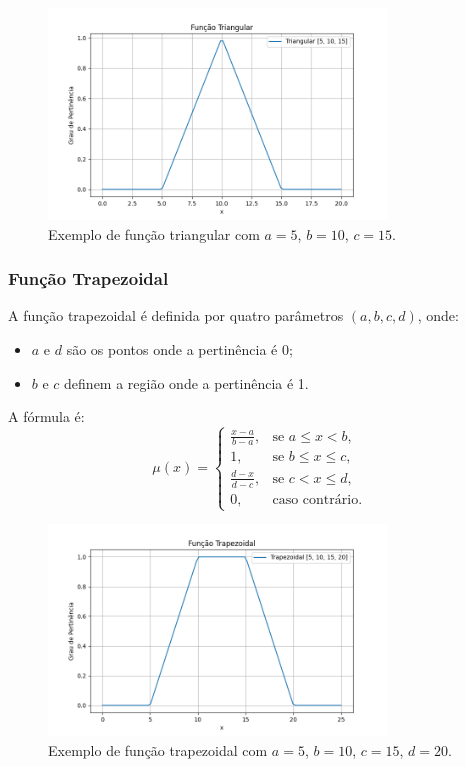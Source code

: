 \documentclass[a4paper,12pt]{article}
\begin{document}
\begin{figure}[H]
    \centering
    \includegraphics[width=0.8\textwidth]{img/triangular.png}
    \caption{Exemplo de função triangular com $a=5$, $b=10$, $c=15$.}
\end{figure}

\subsubsection{Função Trapezoidal}
A função trapezoidal é definida por quatro parâmetros $(a, b, c, d)$, onde:
\begin{itemize}
    \item $a$ e $d$ são os pontos onde a pertinência é 0;
    \item $b$ e $c$ definem a região onde a pertinência é 1.
\end{itemize}
A fórmula é:
\[
\mu(x) =
\begin{cases}
\frac{x - a}{b - a}, & \text{se } a \leq x < b, \\
1, & \text{se } b \leq x \leq c, \\
\frac{d - x}{d - c}, & \text{se } c < x \leq d, \\
0, & \text{caso contrário.}
\end{cases}
\]
\begin{figure}[H]
    \centering
    \includegraphics[width=0.8\textwidth]{img/trapezoidal.png}
    \caption{Exemplo de função trapezoidal com $a=5$, $b=10$, $c=15$, $d=20$.}
\end{figure}
\end{document}

